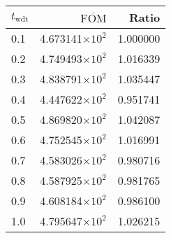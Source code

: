 \begin{tabular}{lrr}
\toprule
$t_{\mathrm{wdt}}$ & $\overline{\mathrm{FOM}}$ &    Ratio \\
\midrule
               0.1 &   4.673141$\times 10^{2}$ & 1.000000 \\
               0.2 &   4.749493$\times 10^{2}$ & 1.016339 \\
               0.3 &   4.838791$\times 10^{2}$ & 1.035447 \\
               0.4 &   4.447622$\times 10^{2}$ & 0.951741 \\
               0.5 &   4.869820$\times 10^{2}$ & 1.042087 \\
               0.6 &   4.752545$\times 10^{2}$ & 1.016991 \\
               0.7 &   4.583026$\times 10^{2}$ & 0.980716 \\
               0.8 &   4.587925$\times 10^{2}$ & 0.981765 \\
               0.9 &   4.608184$\times 10^{2}$ & 0.986100 \\
               1.0 &   4.795647$\times 10^{2}$ & 1.026215 \\
\bottomrule
\end{tabular}
